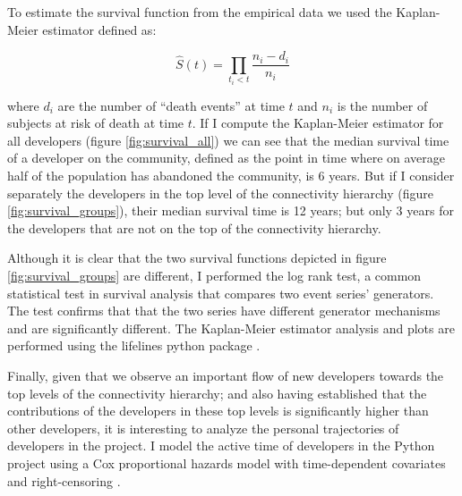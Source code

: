 To estimate the survival function from the empirical data we used the Kaplan-Meier estimator \citep{kaplan:1958} defined as:

$$
\hat{S}(t) = \prod_{t_i < t} \frac{n_i - d_i}{n_i}
$$

where $d_i$ are the number of ``death events'' at time $t$ and $n_i$ is the number of subjects at risk of death at time $t$. If I compute the Kaplan-Meier estimator for all developers (figure \ref{fig:survival_all}) we can see that the median survival time of a developer on the community, defined as the point in time where on average half of the population has abandoned the community, is 6 years. But if I consider separately the developers in the top level of the connectivity hierarchy (figure \ref{fig:survival_groups}), their median survival time is 12 years; but only 3 years for the developers that are not on the top of the connectivity hierarchy.

Although it is clear that the two survival functions depicted in figure \ref{fig:survival_groups} are different, I performed the log rank test, a common statistical test in survival analysis that compares two event series' generators. The test confirms that that the two series have different generator mechanisms and are significantly different. The Kaplan-Meier estimator analysis and plots are performed using the lifelines python package \citep{lifelines:2016}.

Finally, given that we observe an important flow of new developers towards the top levels of the connectivity hierarchy; and also having established that the contributions of the developers in these top levels is significantly higher than other developers, it is interesting to analyze the personal trajectories of developers in the project. I model the active time of developers in the Python project using a Cox proportional hazards model with time-dependent covariates and right-censoring \citep[appendix on survival analysis]{fox:2002}.


